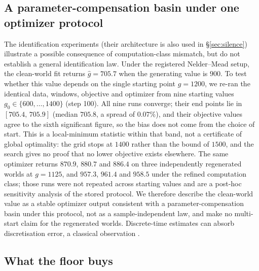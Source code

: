 \documentclass{article}
\begin{document}
\subsection{A parameter-compensation basin under one optimizer protocol}\label{sec:basin}

The identification experiments (their architecture is also used in \S\ref{sec:silence}) illustrate a possible consequence of computation-class mismatch, but do not establish a general identification law. Under the registered Nelder--Mead setup, the clean-world fit returns $\hat g=705.7$ when the generating value is $900$. To test whether this value depends on the single starting point $g{=}1200$, we re-ran the identical data, windows, objective and optimizer from nine starting values $g_0\in\{600,\dots,1400\}$ (step 100). All nine runs converge; their end points lie in $[705.4,\,705.9]$ (median $705.8$, a spread of $0.07\%$), and their objective values agree to the sixth significant figure, so the bias does not come from the choice of start. This is a local-minimum statistic within that band, not a certificate of global optimality: the grid stops at $1400$ rather than the bound of $1500$, and the search gives no proof that no lower objective exists elsewhere. The same optimizer returns $870.9$, $880.7$ and $886.4$ on three independently regenerated worlds at $g{=}1125$, and $957.3$, $961.4$ and $958.5$ under the refined computation class; those runs were not repeated across starting values and are a post-hoc sensitivity analysis of the stored protocol. We therefore describe the clean-world value as a stable optimizer output consistent with a parameter-compensation basin under this protocol, not as a sample-independent law, and make no multi-start claim for the regenerated worlds. Discrete-time estimates can absorb discretisation error, a classical observation \citep{ljung1999}.

\subsection{What the floor buys}
\end{document}
